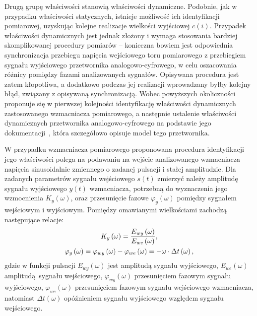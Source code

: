 Drugą grupę właściwości stanowią właściwości dynamiczne. Podobnie, jak w przypadku właściwości statycznych, istnieje możliwość ich identyfikacji pomiarowej, uzyskując kolejne realizacje wielkości wyjściowej $c(i)$. Przypadek właściwości dynamicznych jest jednak złożony i wymaga stosowania bardziej skomplikowanej procedury pomiarów -- konieczna bowiem jest odpowiednia synchronizacja przebiegu napięcia wejściowego toru pomiarowego z przebiegiem sygnału wyjściowego przetwornika analogowo-cyfrowego, w celu oszacowania różnicy pomiędzy fazami analizowanych sygnałów. Opisywana procedura jest zatem kłopotliwa, a dodatkowo podczas jej realizacji wprowadzany byłby kolejny błąd, związany z opisywaną synchronizacją. Wobec powyższych okoliczności proponuje się w pierwszej kolejności identyfikację właściwości dynamicznych zastosowanego wzmacniacza pomiarowego, a następnie ustalenie właściwości dynamicznych przetwornika analogowo-cyfrowego na podstawie jego dokumentacji~\cite{stm_f411}, która szczegółowo opisuje model tego przetwornika.

W przypadku wzmacniacza pomiarowego proponowana procedura identyfikacji jego właściwości polega na podawaniu na wejście analizowanego wzmacniacza napięcia sinusoidalnie zmiennego o zadanej pulsacji i stałej amplitudzie. Dla zadanych parametrów sygnału wejściowego $s(t)$ zmierzyć należy amplitudę sygnału wyjściowego $y(t)$ wzmacniacza, potrzebną do wyznaczenia jego wzmocnienia $K_{y}(\omega)$, oraz przesunięcie fazowe $\varphi_{y}(\omega)$ pomiędzy sygnałem wejściowym i wyjściowym. Pomiędzy omawianymi wielkościami zachodzą następujące relacje:
\begin{gather}
K_{y} \left(\omega\right) = \frac{E_{wy} \left(\omega\right)}{E_{we} \left(\omega\right)} \label{eq:pom_dyn_amp}, \\
\varphi_{y} \left(\omega\right) = \varphi_{wy} \left(\omega\right) - \varphi_{we} \left(\omega\right) = -\omega \cdot \Delta t \left(\omega\right) \label{eq:pom_dyn_phi},
\end{gather}
gdzie w funkcji pulsacji $E_{wy}(\omega)$ jest amplitudą sygnału wyjściowego, $E_{we}(\omega)$ amplitudą sygnału wejściowego, $\varphi_{wy}(\omega)$ przesunięciem fazowym sygnału wyjściowego, $\varphi_{we}(\omega)$ przesunięciem fazowym sygnału wejściowego wzmacniacza, natomiast $\Delta t(\omega)$ opóźnieniem sygnału wyjściowego względem sygnału wejściowego.

